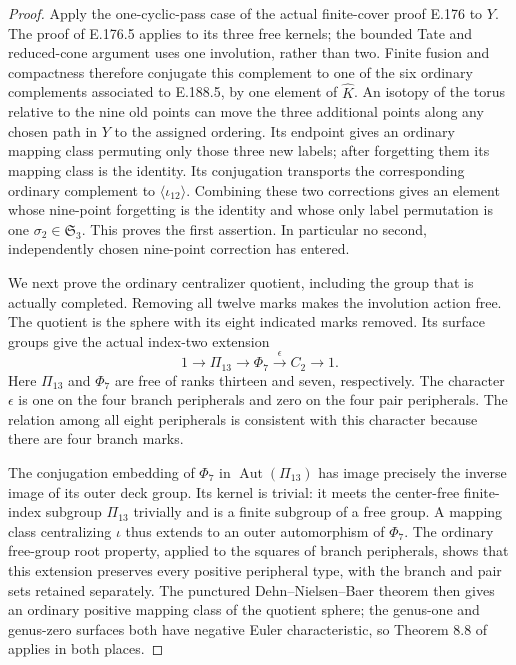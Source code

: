 \begin{proof}
Apply the one-cyclic-pass case of the actual finite-cover
proof E.176 to \(Y\).  The proof of E.176.5 applies to its
three free kernels; the bounded Tate and reduced-cone
argument uses one involution, rather than two.  Finite
fusion and compactness therefore conjugate this complement
to one of the six ordinary complements associated to
E.188.5, by one element of \(\widehat K\).
An isotopy of the torus relative to the nine old points
can move the three additional points along any chosen path
in \(Y\) to the assigned ordering.  Its endpoint gives an
ordinary mapping class permuting only those three new
labels; after forgetting them its mapping class is the
identity.  Its conjugation transports the corresponding
ordinary complement to \(\langle\iota_{12}\rangle\).
Combining these two corrections gives an element whose
nine-point forgetting is the identity and whose only
label permutation is one \(\sigma_2\in\mathfrak S_3\).
This proves the first assertion.  In particular no second,
independently chosen nine-point correction has entered.

We next prove the ordinary centralizer quotient, including
the group that is actually completed.  Removing all
twelve marks makes the involution action free.  The
quotient is the sphere with its eight indicated marks
removed.  Its surface groups give the actual index-two
extension
\[
 1\longrightarrow \Pi_{13}\longrightarrow \Phi_7
       \xrightarrow{\epsilon}C_2\longrightarrow1.
\tag{E.188.6}
\]
Here \(\Pi_{13}\) and \(\Phi_7\) are free of ranks thirteen
and seven, respectively.  The character \(\epsilon\)
is one on the four branch peripherals and zero on the
four pair peripherals.  The relation among all eight
peripherals is consistent with this character because
there are four branch marks.

The conjugation embedding of \(\Phi_7\) in
\(\operatorname{Aut}(\Pi_{13})\) has image precisely the
inverse image of its outer deck group.  Its kernel is
trivial: it meets the center-free finite-index subgroup
\(\Pi_{13}\) trivially and is a finite subgroup of a free
group.  A mapping class centralizing \(\iota\) thus extends
to an outer automorphism of \(\Phi_7\).
The ordinary free-group root property, applied to the
squares of branch peripherals, shows that this extension
preserves every positive peripheral type, with the branch
and pair sets retained separately.
The punctured Dehn--Nielsen--Baer theorem then gives an
ordinary positive mapping class of the quotient sphere;
the genus-one and genus-zero surfaces both have negative
Euler characteristic, so Theorem 8.8 of
\citet[version 5.0, pp.245--246]{LitFarbMargalit2011Version5}
applies in both places.


\end{proof}

